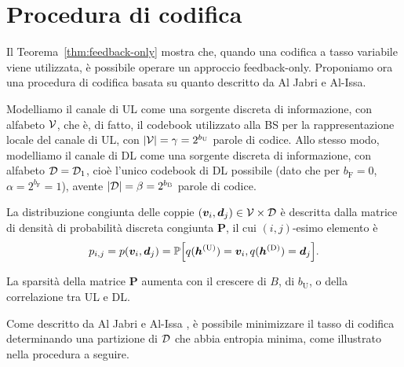 \section{Procedura di codifica}
\label{sec:procedure}

Il Teorema~\ref{thm:feedback-only} mostra che, quando una codifica a tasso
variabile viene utilizzata, è possibile operare un approccio feedback-only.
Proponiamo ora una procedura di codifica basata su quanto descritto da Al Jabri
e Al-Issa.\cite{10.1007/BFb0024445}

Modelliamo il canale di UL come una sorgente discreta di informazione, con
alfabeto \(\mathcal{V}\), che è, di fatto, il codebook utilizzato alla BS per la
rappresentazione locale del canale di UL, con \(\abs{\set{V}} = \gamma =
2^{b_\mathrm{U}}\) parole di codice. Allo stesso modo, modelliamo il canale di
DL come una sorgente discreta di informazione, con alfabeto \(\mathcal{D} =
\mathcal{D}_1\), cioè l'unico codebook di DL possibile (dato che per \(b_\mathrm{F}
= 0\), \(\alpha = 2^{b_\mathrm{F}} = 1\)), avente \(\abs{\set{D}} = \beta =
2^{b_\mathrm{B}}\) parole di codice.

La distribuzione congiunta delle coppie \((\bm{v}_i,\bm{d}_j) \in
\mathcal{V} \times \mathcal{D}\) è descritta dalla matrice di densità di probabilità
discreta congiunta \(\bm{P}\), il cui \((i,j)\)-esimo elemento è
\begin{equation}
    p_{i,j} = p(\bm{v}_i, \bm{d}_j) = \prob{
        q(\bm{h}^\mathrm{(U)}) = \bm{v}_i ,
        q(\bm{h}^\mathrm{(D)}) = \bm{d}_j
    } .
\end{equation}

La sparsità della matrice \(\bm{P}\) aumenta con il crescere di \(B\), di
\(b_\mathrm{U}\), o della correlazione tra UL e DL.

Come descritto da Al Jabri e Al-Issa \cite{10.1007/BFb0024445}, è possibile
minimizzare il tasso di codifica determinando una partizione di \(\mathcal{D}\) che
abbia entropia minima, come illustrato nella procedura a seguire.

